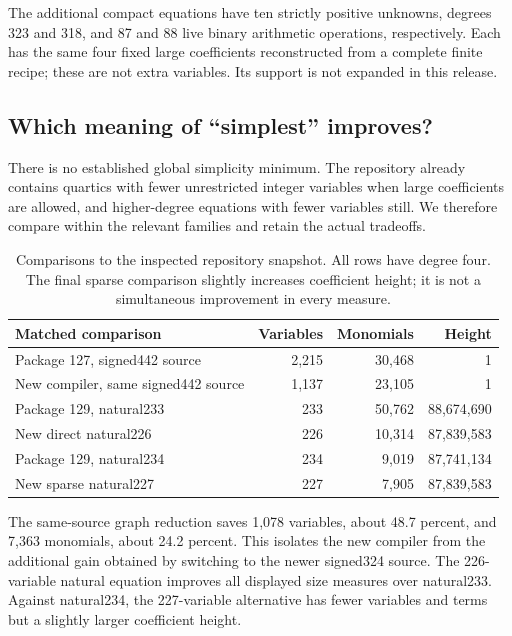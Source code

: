 \documentclass[11pt,letterpaper]{article}
\theoremstyle{definition}\newtheorem{definition}[theorem]{Definition}
\theoremstyle{remark}\newtheorem{remark}[theorem]{Remark}
\begin{document}
The additional compact equations have ten strictly positive unknowns,
degrees 323 and 318, and 87 and 88 live binary arithmetic operations,
respectively. Each has the same four fixed
large coefficients reconstructed from a complete finite recipe; these
are not extra variables. Its support is not expanded in this release.

\subsection{Which meaning of ``simplest'' improves?}

There is no established global simplicity minimum. The repository already
contains quartics with fewer unrestricted integer variables when large
coefficients are allowed, and higher-degree equations with fewer variables
still. We therefore compare within the relevant families and retain the
actual tradeoffs.

\begin{table}[ht]
\centering\small
\begin{tabular}{@{}lrrr@{}}
\toprule
Matched comparison & Variables & Monomials & Height\\
\midrule
Package 127, signed442 source & 2,215 & 30,468 & 1\\
New compiler, same signed442 source & 1,137 & 23,105 & 1\\
Package 129, natural233 & 233 & 50,762 & 88,674,690\\
New direct natural226 & 226 & 10,314 & 87,839,583\\
Package 129, natural234 & 234 & 9,019 & 87,741,134\\
New sparse natural227 & 227 & 7,905 & 87,839,583\\
\bottomrule
\end{tabular}
\caption{Comparisons to the inspected repository snapshot. All rows have
degree four. The final sparse comparison slightly increases coefficient
height; it is not a simultaneous improvement in every measure.}
\label{tab:comparison}
\end{table}

The same-source graph reduction saves 1,078 variables, about 48.7 percent,
and 7,363 monomials, about 24.2 percent. This isolates the new compiler
from the additional gain obtained by switching to the newer signed324
source. The 226-variable natural equation improves all displayed size
measures over natural233. Against natural234, the 227-variable alternative
has fewer variables and terms but a slightly larger coefficient height.
\end{document}
